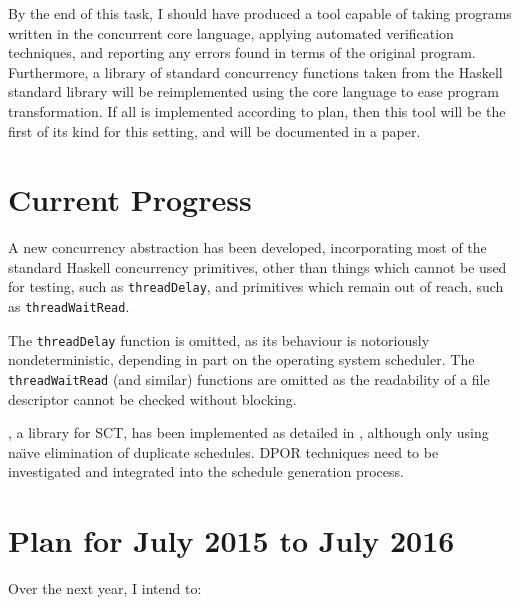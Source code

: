 By the end of this task, I should have produced a tool capable of
taking programs written in the concurrent core language, applying
automated verification techniques, and reporting any errors found in
terms of the original program. Furthermore, a library of standard
concurrency functions taken from the Haskell standard library will be
reimplemented using the core language to ease program
transformation. If all is implemented according to plan, then this
tool will be the first of its kind for this setting, and will be
documented in a paper.

\section{Current Progress}
\label{sec:proposal-progress}

A new concurrency abstraction has been developed, incorporating most
of the standard Haskell concurrency primitives, other than things
which cannot be used for testing, such as \verb|threadDelay|, and
primitives which remain out of reach, such as \verb|threadWaitRead|.

The \verb|threadDelay| function is omitted, as its behaviour is
notoriously nondeterministic, depending in part on the operating
system scheduler. The \verb|threadWaitRead| (and similar) functions
are omitted as the readability of a file descriptor cannot be checked
without blocking.

\dejafu{}, a library for SCT, has been implemented as detailed in
, although only using na\"{\i}ve elimination of duplicate
schedules. DPOR techniques need to be investigated and integrated into
the schedule generation process.

\section{Plan for July 2015 to July 2016}
\label{sec:proposal-plan}

Over the next year, I intend to:


